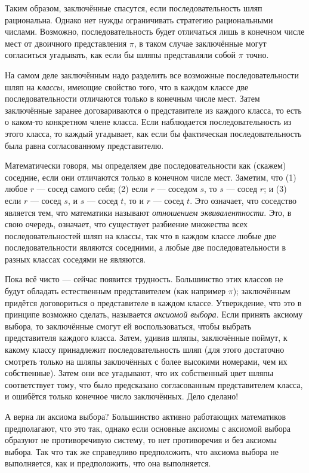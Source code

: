 Таким образом, заключённые спасутся, если последовательность шляп рациональна.
Однако нет нужды ограничивать стратегию рациональными числами.
Возможно, последовательность будет отличаться лишь в конечном числе мест от двоичного представления $\pi$, в таком случае заключённые могут согласиться угадывать, как если бы шляпы представляли собой $\pi$ точно.

На самом деле заключённым надо разделить все возможные последовательности шляп на \emph{классы}, имеющие свойство того, что в каждом классе две последовательности отличаются только в конечным числе мест.
Затем заключённые заранее договариваются о представителе из каждого класса, то есть о каком-то конкретном члене класса.
Если наблюдается последовательность из этого класса, то каждый угадывает, как если бы фактическая последовательность была равна согласованному представителю.

Математически говоря, мы определяем две последовательности как (скажем) соседние, если они отличаются только в конечном числе мест.
Заметим, что
(1) любое $r$ --- сосед самого себя;
(2) если $r$ --- соседом $s$, то $s$ --- сосед $r$; и
(3) если $r$ --- сосед $s$, и $s$ --- сосед $t$, то и $r$ --- сосед $t$.
Это означает, что соседство является тем, что математики называют \emph{отношением эквивалентности}.
Это, в свою очередь, означает, что существует разбиение множества всех последовательностей шляп на классы, так что в каждом классе любые две последовательности являются соседними, а любые две последовательности в разных классах соседями не являются.

Пока всё чисто --- сейчас появится трудность.
Большинство этих классов не будут обладать естественным представителем (как например $\pi$);
заключённым придётся договориться о представителе в каждом классе.
Утверждение, что это в принципе возможно сделать, называется \emph{аксиомой выбора}.
Если принять аксиому выбора, то заключённые смогут ей воспользоваться, чтобы выбрать представителя каждого класса.
Затем, удивив шляпы, заключённые поймут, к какому классу принадлежит последовательность шляп (для этого достаточно смотреть только на шляпы заключённых с более высокими номерами, чем их собственные).
Затем они все угадывают, что их собственный цвет шляпы соответствует тому, что было предсказано согласованным представителем класса, и ошибётся только конечное число заключённых.
Дело сделано!

А верна ли аксиома выбора?
Большинство активно работающих математиков предполагают, что это так, однако если основные аксиомы с аксиомой выбора образуют не противоречивую систему, то нет противоречия и без аксиомы выбора.
Так что так же справедливо предположить, что аксиома выбора не выполняется, как и предположить, что она выполняется.

